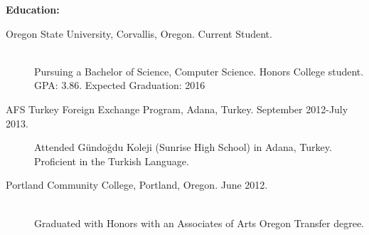\documentclass[11pt]{article}
\begin{document}
\bigskip

{\Large \bf Education:}
\begin{description}
	\item[Oregon State University, Corvallis, Oregon.
		\hfill Current Student.]
		\hfill \\
		Pursuing a Bachelor of Science, Computer Science. 
		Honors College student. GPA: 3.86. Expected Graduation: 2016
		
	\item[AFS Turkey Foreign Exchange Program, Adana, Turkey. 
		\hfill September 2012-July 2013.]
		Attended Gündoğdu Koleji (Sunrise High School) in Adana, 
		Turkey. Proficient in the Turkish Language.

	\item[Portland Community College, Portland, Oregon.
		\hfill June 2012.]
		\hfill \\
		Graduated with Honors with an Associates of Arts 
		Oregon Transfer degree.

\end{description}

\bigskip
\end{document}
